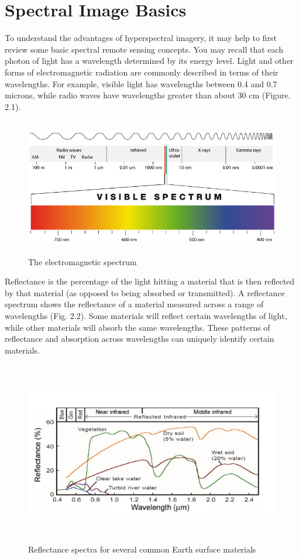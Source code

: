 \documentclass[document.tex]{subfiles}
\begin{document}
\section{Spectral Image Basics}
\noindent To understand the advantages of hyperspectral imagery, it may help to first review some
basic spectral remote sensing concepts. You may recall that each photon of light has
a wavelength determined by its energy level. Light and other forms of electromagnetic
radiation are commonly described in terms of their wavelengths. For example, visible
light has wavelengths between 0.4 and 0.7 microns, while radio waves have wavelengths
greater than about 30 cm (Figure. 2.1).
\begin{figure}[H]
	\begin{center}
		\includegraphics[height=6.0cm]{imgs/Electromagnetic_spectrum.png}
	\end{center}
	\caption{The electromagnetic spectrum\cite{35}}
	\label{fig: The electromagnetic spectrum}
\end{figure}
\noindent Reflectance is the percentage of the light hitting a material that is then reflected by
that material (as opposed to being absorbed or transmitted). A reflectance spectrum
shows the reflectance of a material measured across a range of wavelengths (Fig. 2.2).
Some materials will reflect certain wavelengths of light, while other materials will absorb
the same wavelengths. These patterns of reflectance and absorption across wavelengths
can uniquely identify certain materials.
\begin{figure}[H]
	\begin{center}
		\includegraphics[height=8.0cm]{imgs/Materials.png}
	\end{center}
	\caption{Reflectance spectra for several common Earth surface materials\cite{35}}
	\label{fig: Reflectance spectra for several common Earth surface materials}
\end{figure}
\end{document}
